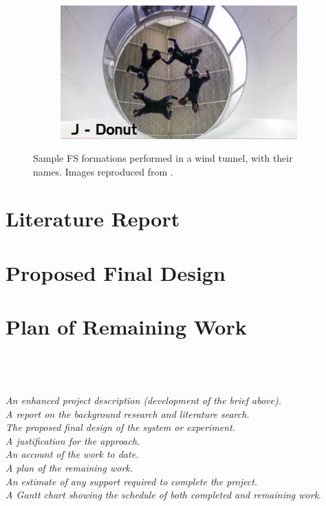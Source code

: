 \documentclass[a4paper, 11pt]{article}
\begin{document}
\begin{figure}[H]
\begin{subfigure}{.5\textwidth}
	\end{subfigure}%
	\begin{subfigure}{.5\textwidth}
		\centering
		\includegraphics[width=0.9\linewidth]{Tunnel_Donut.png}
	\end{subfigure}%
	\caption{Sample FS formations performed in a wind tunnel, with their names. Images reproduced from \cite{tunnel_fs_dive_pool}. }
	\label{fig:sample_tunnel}
\end{figure}
%

\section{Literature Report}
\section{Proposed Final Design}
\section{Plan of Remaining Work}

\emph{\\\\\\An enhanced project description (development of the brief above).\\
A report on the background research and literature search.\\
The proposed final design of the system or experiment.\\
A justification for the approach.\\
An account of the work to date.\\
A plan of the remaining work.\\
An estimate of any support required to complete the project.\\
A Gantt chart showing the schedule of both completed and remaining work}.\\
\end{document}
